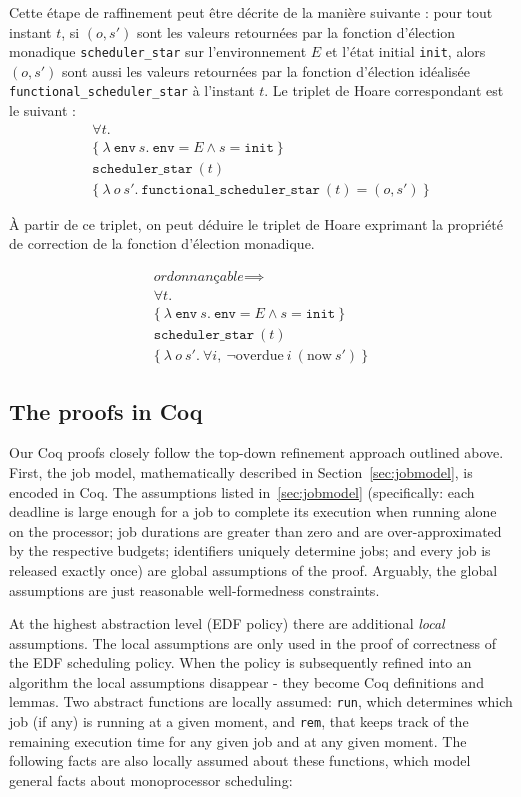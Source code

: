	Cette étape de raffinement peut être décrite de la manière suivante : pour tout instant $t$, si $(o, s')$ sont les valeurs retournées par la fonction d'élection monadique \texttt{scheduler\_star} sur l'environnement $E$ et l'état initial \texttt{init}, alors $(o, s')$ sont aussi les valeurs retournées par la fonction d'élection idéalisée \texttt{functional\_scheduler\_star} à l'instant $t$. Le triplet de Hoare correspondant est le suivant :
	\begin{gather*}
		\forall t.\\
		\{
		~\lambda~\mathtt{env}~s. ~\mathtt{env} = E \land s = \mathtt{init}~
		\}\\
		\texttt{scheduler\_star}~(t)\\
		\{
		~\lambda~o~s'. ~\texttt{functional\_scheduler\_star}~(t) = (o,s')~
		\}
	\end{gather*}

	À partir de ce triplet, on peut déduire le triplet de Hoare exprimant la propriété de correction de la fonction d'élection monadique.

	\begin{gather*}
		\textit{ordonnançable} \implies\\
		\forall t.\\
		\{
		~\lambda~\mathtt{env}~s. ~\mathtt{env} = E \land s = \mathtt{init}~
		\}\\
		\texttt{scheduler\_star}~(t)\\
		\{
		~\lambda~o~s'. ~\forall i,~\neg \text{overdue}~i~(\text{now}~s') ~
		\}
	\end{gather*}


	\subsection{The proofs in Coq}
	Our Coq proofs closely follow the top-down refinement approach outlined above. First, the job model, mathematically described in Section~\ref{sec:jobmodel}, is encoded in Coq. The assumptions listed in~\ref{sec:jobmodel} (specifically: each deadline is large enough for a job to complete its execution when running alone on the processor; job durations are greater than zero and are over-approximated by the respective budgets; identifiers uniquely determine jobs; and every job is released exactly once) are global assumptions of the proof. Arguably, the global assumptions are just reasonable well-formedness constraints.



	At the highest abstraction level (EDF policy) there are additional \emph{local} assumptions.
	The local assumptions are only used in the proof of correctness of the EDF scheduling policy. When the policy is subsequently
	refined into an algorithm the local assumptions disappear - they become Coq definitions and lemmas.
	Two abstract functions are locally assumed: \texttt{run}, which determines which job (if any) is  running at a given moment, and \texttt{rem}, that keeps track of the remaining execution time for any given job and at any given moment.
	The following facts are also locally assumed about these functions, which model general facts about monoprocessor scheduling:
	
